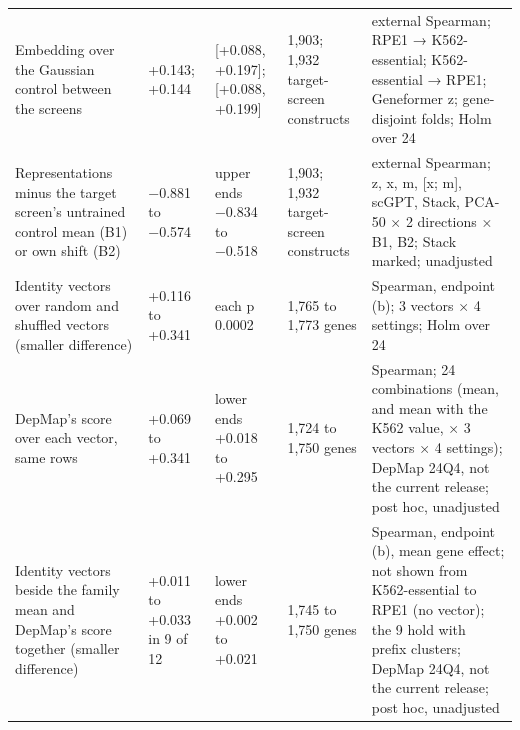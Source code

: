 \begin{tabular}{lllll}
Embedding over the Gaussian control between the screens & +0.143; +0.144 & [+0.088, +0.197]; [+0.088, +0.199] & 1,903; 1,932 target-screen constructs & external Spearman; RPE1 → K562-essential; K562-essential → RPE1; Geneformer z; gene-disjoint folds; Holm over 24 \\
Representations minus the target screen's untrained control mean (B1) or own shift (B2) & −0.881 to −0.574 & upper ends −0.834 to −0.518 & 1,903; 1,932 target-screen constructs & external Spearman; z, x, m, [x; m], scGPT, Stack, PCA-50 × 2 directions × B1, B2; Stack marked; unadjusted \\
Identity vectors over random and shuffled vectors (smaller difference) & +0.116 to +0.341 & each p 0.0002 & 1,765 to 1,773 genes & Spearman, endpoint (b); 3 vectors × 4 settings; Holm over 24 \\
DepMap's score over each vector, same rows & +0.069 to +0.341 & lower ends +0.018 to +0.295 & 1,724 to 1,750 genes & Spearman; 24 combinations (mean, and mean with the K562 value, × 3 vectors × 4 settings); DepMap 24Q4, not the current release; post hoc, unadjusted \\
Identity vectors beside the family mean and DepMap's score together (smaller difference) & +0.011 to +0.033 in 9 of 12 & lower ends +0.002 to +0.021 & 1,745 to 1,750 genes & Spearman, endpoint (b), mean gene effect; not shown from K562-essential to RPE1 (no vector); the 9 hold with prefix clusters; DepMap 24Q4, not the current release; post hoc, unadjusted \\
\bottomrule
\end{tabular}
